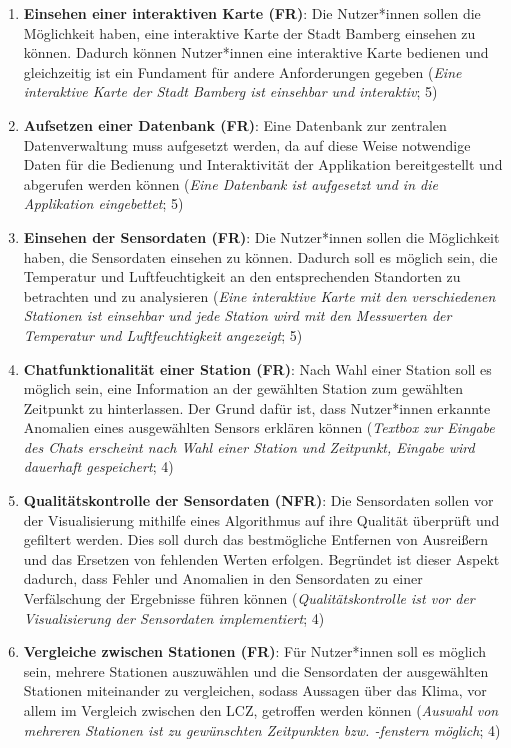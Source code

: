 \begin{enumerate}
    \item \textbf{Einsehen einer interaktiven Karte (\ac{FR})}: Die Nutzer*innen sollen die Möglichkeit haben, eine interaktive Karte der Stadt Bamberg einsehen zu können. Dadurch können Nutzer*innen eine interaktive Karte bedienen und gleichzeitig ist ein Fundament für andere Anforderungen gegeben (\textit{Eine interaktive Karte der Stadt Bamberg ist einsehbar und interaktiv}; 5)
    \item \textbf{Aufsetzen einer Datenbank (\ac{FR})}: Eine Datenbank zur zentralen Datenverwaltung muss aufgesetzt werden, da auf diese Weise notwendige Daten für die Bedienung und Interaktivität der Applikation bereitgestellt und  abgerufen werden können (\textit{Eine Datenbank ist aufgesetzt und in die Applikation eingebettet}; 5)
    \item \textbf{Einsehen der Sensordaten (\ac{FR})}: Die Nutzer*innen sollen die Möglichkeit haben, die Sensordaten einsehen zu können. Dadurch soll es möglich sein, die Temperatur und Luftfeuchtigkeit an den entsprechenden Standorten zu betrachten und zu analysieren (\textit{Eine interaktive Karte mit den verschiedenen Stationen ist einsehbar und jede Station wird mit den Messwerten der Temperatur und Luftfeuchtigkeit angezeigt}; 5)
    \item \textbf{Chatfunktionalität einer Station (\ac{FR})}: Nach Wahl einer Station soll es möglich sein, eine Information an der gewählten Station zum gewählten Zeitpunkt zu hinterlassen. Der Grund dafür ist, dass Nutzer*innen erkannte Anomalien eines ausgewählten Sensors erklären können (\textit{Textbox zur Eingabe des Chats erscheint nach Wahl einer Station und Zeitpunkt, Eingabe wird dauerhaft gespeichert}; 4)
    \item \textbf{Qualitätskontrolle der Sensordaten (\ac{NFR})}: Die Sensordaten sollen vor der Visualisierung mithilfe eines Algorithmus auf ihre Qualität überprüft und gefiltert werden. Dies soll durch das bestmögliche Entfernen von Ausreißern und das Ersetzen von fehlenden Werten erfolgen. Begründet ist dieser Aspekt dadurch, dass Fehler und Anomalien in den Sensordaten zu einer Verfälschung der Ergebnisse führen können (\textit{Qualitätskontrolle ist vor der Visualisierung der Sensordaten implementiert}; 4)
    \item \textbf{Vergleiche zwischen Stationen (\ac{FR})}: Für Nutzer*innen soll es möglich sein, mehrere Stationen auszuwählen und die Sensordaten der ausgewählten Stationen miteinander zu vergleichen, sodass Aussagen über das Klima, vor allem im Vergleich zwischen den \ac{LCZ}, getroffen werden können (\textit{Auswahl von mehreren Stationen ist zu gewünschten Zeitpunkten bzw. -fenstern möglich}; 4)

\end{enumerate}
